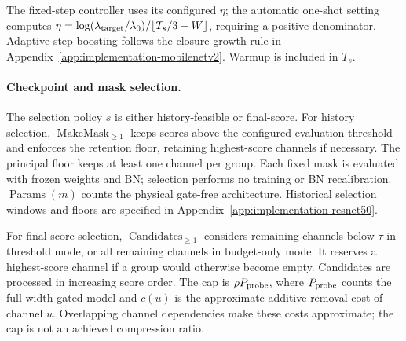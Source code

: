 The fixed-step controller uses its configured $\eta$; the automatic
one-shot setting computes
$\eta=\log(\lambda_{\rm target}/\lambda_0)/\lfloor T_s/3-W\rfloor$,
requiring a positive denominator. Adaptive step boosting follows the
closure-growth rule in Appendix~\ref{app:implementation-mobilenetv2}.
Warmup is included in $T_s$.

\paragraph{Checkpoint and mask selection.}
The selection policy $s$ is either history-feasible or final-score.
For history selection, $\operatorname{MakeMask}_{\geq1}$ keeps scores
above the configured evaluation threshold and enforces the retention
floor, retaining highest-score channels if necessary. The principal
floor keeps at least one channel per group. Each fixed mask is evaluated
with frozen weights and BN; selection performs no training or BN
recalibration. $\operatorname{Params}(m)$ counts the physical gate-free
architecture. Historical selection windows and floors are specified in
Appendix~\ref{app:implementation-resnet50}.

For final-score selection, $\operatorname{Candidates}_{\geq1}$ considers
remaining channels below $\tau$ in threshold mode, or all remaining
channels in budget-only mode. It reserves a highest-score channel if a
group would otherwise become empty. Candidates are processed in increasing
score order. The cap is $\rho P_{\rm probe}$, where $P_{\rm probe}$ counts
the full-width gated model and $c(u)$ is the approximate additive removal
cost of channel $u$. Overlapping channel dependencies make these costs
approximate; the cap is not an achieved compression ratio.

